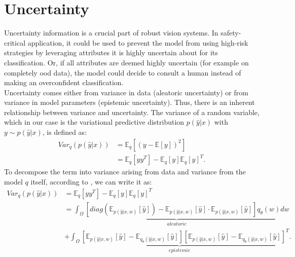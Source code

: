 \documentclass[a4paper,cleardoubleempty,BCOR1cm, 11pt]{report}
\begin{document}
\section{Uncertainty}
Uncertainty information is a crucial part of robust vision systems. In safety-critical application, it could be used to prevent the model from using high-risk strategies by leveraging attributes it is highly uncertain about for its classification. Or, if all attributes are deemed highly uncertain (for example on completely ood data), the model could decide to consult a human instead of making an overconfident classification.\\
Uncertainty comes either from variance in data (aleatoric uncertainty) or from variance in model parameters (epistemic uncertainty). Thus, there is an inherent relationship between variance and uncertainty.
The variance of a random variable, which in our case is the variational predictive distribution $p(\hat{y} | x)$ with $y\sim p(\hat{y} | x)$, is defined as:
\begin{align}
	Var_q(p(\hat{y} | x)) &= \mathbb{E}_q \left[ (y-\mathbb{E}\left[ y\right])^2 \right]\\
	&= \mathbb{E}_q \left[yy^T\right]  - \mathbb{E}_q\left[y\right]\mathbb{E}_q\left[y\right]^T.
\end{align}
To decompose the term into variance arising from data and variance from the model $q$ itself, according to \citet{kwon2020uncertainty}, we can write it as:
\begin{align}
Var_q(p(\hat{y} | x)) &= \mathbb{E}_q \left[yy^T\right]  - \mathbb{E}_q\left[y\right]\mathbb{E}_q\left[y\right]^T\\
	&\underbrace{=\int_{\Omega}\left[ diag (\mathbb{E}_{p(\hat{y}|x,w)}[\hat{y}]) -\mathbb{E}_{p(\hat{y}|x,w)}[\hat{y}] \cdot \mathbb{E}_{p(\hat{y}|x,w)}[\hat{y}] \right]q_{\theta}(w)dw}_{aleatoric}\\
	&+\underbrace{\int_{\Omega}\left[ \mathbb{E}_{p(\hat{y}|x,w)}[\hat{y}] - \mathbb{E}_{q_{\theta}(\hat{y}|x,w)}[\hat{y}] \right] \left[ \mathbb{E}_{p(\hat{y}|x,w)}[\hat{y}] - \mathbb{E}_{q_{\theta}(\hat{y}|x,w)}[\hat{y}] \right]^T}_{epistemic}.
\end{align}
\end{document}
